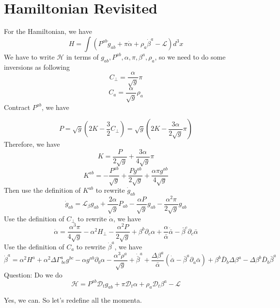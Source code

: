 \documentclass{article}
\begin{document}
\section{Hamiltonian Revisited}
For the Hamiltonian, we have
\[
H = \int( P^{ab}{\dot g_{ab}} + \pi {\dot \alpha} + \rho_{a} {\dot \beta^{a}} - \mathscr{L} )d^3 x
\]
We have to write $\mathcal{H}$ in terms of $g_{ab},P^{ab},\alpha,\pi,\beta^{a},\rho_{a}$, so we need to do some inversions as following
\[
\boxed{C_{\perp} = \frac{\alpha}{\sqrt{g}}\pi}
\]
\[
\boxed{C_{a} = \frac{\alpha}{\sqrt{g}}\rho_{a}}
\]
Contract $P^{ab}$, we have

\[
P = \sqrt{g}(2K - \frac{3}{2}C_{\perp}) = \sqrt{g}(2K - \frac{3\alpha}{2\sqrt{g}}\pi)
\]
Therefore, we have
\[
\boxed{K = \frac{P}{2\sqrt{g}} + \frac{3\alpha}{4\sqrt{g}}\pi}
\]
\[
\boxed{
K^{ab} = -\frac{P^{ab}}{\sqrt{g}} + \frac{Pg^{ab}}{2\sqrt{g}} + \frac{\alpha \pi g^{ab}}{4\sqrt{g}}
}
\]
Then use the definition of $K^{ab}$ to rewrite ${\dot g_{ab}}$
\[
\boxed{
{\dot g_{ab}} = \mathcal{L}_{\beta}g_{ab} + \frac{2\alpha}{\sqrt{g}}P_{ab} - \frac{\alpha P}{\sqrt{g}}g_{ab} - \frac{\alpha^2 \pi }{2\sqrt{g}}g_{ab}
}
\]
Use the definition of $C_{\perp}$ to rewrite ${\dot \alpha }$, we have
\[
{\dot \alpha} = \frac{\alpha^{3}\pi}{4\sqrt{g}} - \alpha^{2}H_{\perp} - \frac{\alpha^{2}P}{2\sqrt{g}} + \beta^{b}\partial_{c}\alpha + \frac{\alpha}{{\bar \alpha}}{\dot {\bar \alpha}} - {\bar \beta}^{c}\partial_{c}{\bar \alpha}
\]
Use the definition of $C_{a}$ to rewrite ${\dot \beta}^{a}$, we have
\[
{\dot \beta}^{a} = \alpha^{2}H^{a} + \alpha^{2}\Delta \Gamma^{a}_{~bc}g^{bc} - \alpha g^{ab}\partial_{b}\alpha - \frac{\alpha^{3}\rho^{a}}{\sqrt{g}} + {\dot{\bar \beta}^{a}} + \frac{\Delta \beta^{a}}{{\bar \alpha}}({\dot {\bar \alpha}} - {\bar \beta}^{a}\partial_{a}{\bar \alpha}) + \beta^{b}{\bar D}_{b}\Delta \beta^{a} - \Delta \beta^{b}{\bar D}_{b}{\bar \beta}^{a}
\]
Question: Do we do
\[
\mathcal{H} = P^{ab}\mathscr{D}_{t}g_{ab} + \pi \mathscr{D}_{t}\alpha + \rho_{a} \mathscr{D}_{t}\beta^{a} - \mathscr{L}
\]

Yes, we can. So let's redefine all the momenta. 
\end{document}
